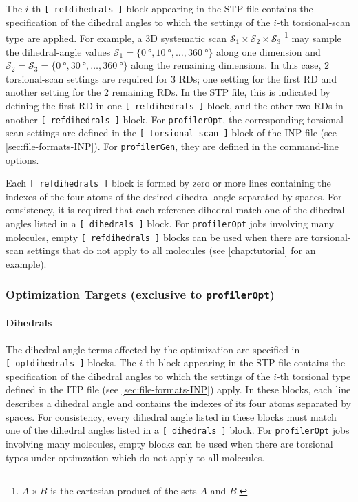 \documentclass[10pt,a4paper,openany]{memoir}
\numberwithin{equation}{section}
\newcommand{\profileropt}[0]{\texttt{profilerOpt}}
\newcommand{\profilergen}[0]{\texttt{profilerGen}}
\begin{document}
The $i$-th \texttt{[~refdihedrals~]} block appearing in the STP file
contains the specification of the dihedral angles to which the
settings of the $i$-th torsional-scan type are applied.
%
For example, a 3D systematic scan
$\mathcal{S}_1 \times \mathcal{S}_2 \times \mathcal{S}_3$
\footnote{$A \times B$ is the cartesian product of the sets $A$ and
  $B$.}  may sample the dihedral-angle values
$\mathcal{S}_1 = \{\SI{0}{\degree}, \SI{10}{\degree}, \ldots,
\SI{360}{\degree}\}$ along one dimension and
$\mathcal{S}_2 = \mathcal{S}_3 = \{\SI{0}{\degree}, \SI{30}{\degree},
\ldots, \SI{360}{\degree}\}$ along the remaining dimensions.
%
In this case, $2$ torsional-scan settings are required for $3$ RDs;
one setting for the first RD and another setting for the 2 remaining RDs.
%
In the STP file, this is indicated by defining the first RD in one
\texttt{[~refdihedrals~]} block, and the other two RDs in another
\texttt{[~refdihedrals~]} block.
%
For \profileropt{}, the corresponding torsional-scan settings are
defined in the \texttt{[~torsional\_scan~]} block of the INP file (see
\autoref{sec:file-formats-INP}).
%
For \profilergen{}, they are defined in the command-line options.

Each \texttt{[~refdihedrals~]} block is formed by zero or more lines
containing the indexes of the four atoms of the desired dihedral angle
separated by spaces. For consistency, it is required that each
reference dihedral match one of the dihedral angles listed in a
\texttt{[~dihedrals~]} block. For \profileropt{} jobs involving many
molecules, empty \texttt{[~refdihedrals~]} blocks can be used when
there are torsional-scan settings that do not apply to all molecules
(see \autoref{chap:tutorial} for an example).

\subsubsection{Optimization Targets (exclusive to \profileropt{})}
\label{sec:stp-optterms}

\paragraph{Dihedrals}

The dihedral-angle terms affected by the optimization are specified in
\texttt{[~optdihedrals~]} blocks. The $i$-th block appearing in the
STP file contains the specification of the dihedral angles to which
the settings of the $i$-th torsional type defined in the ITP file (see
\autoref{sec:file-formats-INP}) apply.  In these blocks, each line
describes a dihedral angle and contains the indexes of its four atoms
separated by spaces. For consistency, every dihedral angle listed in
these blocks must match one of the dihedral angles listed in a
\texttt{[~dihedrals~]} block.  For \profileropt{} jobs involving many
molecules, empty blocks can be used when there are torsional types
under optimzation which do not apply to all molecules.
\end{document}
